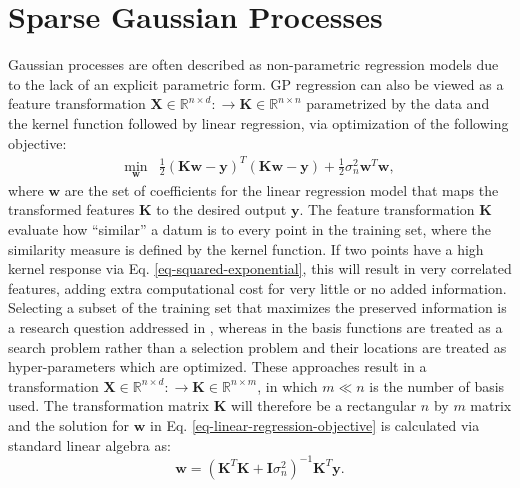 \documentclass[useAMS,usenatbib,fleqn]{mn2e}
\begin{document}
\section{Sparse Gaussian Processes}
\label{sec-sparse-gaussian-processes}
Gaussian processes are often described as non-parametric regression models due to the lack of an explicit parametric form. GP regression can also be viewed as a feature transformation $\mathbf{X}\in \mathbb{R}^{n\times d}:\rightarrow \mathbf{K}\in \mathbb{R}^{n\times n}$ parametrized by the data and the kernel function followed by linear regression, via optimization of the following objective:
\begin{equation}
\label{eq-linear-regression-objective}
\begin{array}{lcl}
\underset{\mathbf{w}}{\text{min}} &\frac{1}{2}\left ( \mathbf{K}\mathbf{w}-\mathbf{y} \right )^{T}\left( \mathbf{K}\mathbf{w}-\mathbf{y} \right )+\frac{1}{2}\sigma_{n}^{2}\mathbf{w}^{T}\mathbf{w},
\end{array}
\end{equation}
where $\mathbf{w}$ are the set of coefficients for the linear regression model that maps the transformed features $\mathbf{K}$ to the desired output $\mathbf{y}$. The feature transformation $\mathbf{K}$ evaluate how ``similar'' a datum is to every point in the training set, where the similarity measure is defined by the kernel function. If two points have a high kernel response via  Eq. \eqref{eq-squared-exponential}, this will result in very correlated features, adding extra computational cost for very little or no added information. Selecting a subset of the training set that maximizes the preserved information is a research question addressed in \citep{foster2009}, whereas in \citep{snelson2005} the basis functions are treated as a search problem rather than a selection problem and their locations are treated as hyper-parameters which are optimized. These approaches result in a transformation $\mathbf{X}\in \mathbb{R}^{n\times d}:\rightarrow \mathbf{K}\in \mathbb{R}^{n\times m}$, in which $m\ll n$ is the number of basis used. The transformation matrix $\mathbf{K}$ will therefore be a rectangular $n$ by $m$ matrix and the solution for $\mathbf{w}$ in  Eq. \eqref{eq-linear-regression-objective} is calculated via standard linear algebra as:
\begin{equation}
\label{eq-linear-regression-objective-rectangular}
\mathbf{w} = \left(\mathbf{K}^{T}\mathbf{K}+\mathbf{I}\sigma_{n}^{2} \right)^{-1}\mathbf{K}^{T}\mathbf{y}.
\end{equation}
\end{document}
